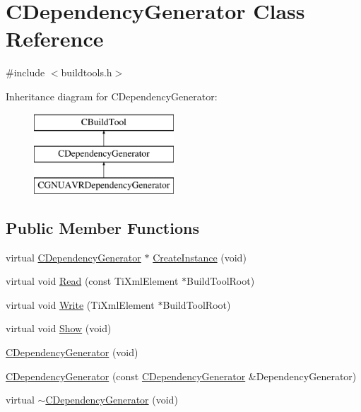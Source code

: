 \hypertarget{classCDependencyGenerator}{\section{C\-Dependency\-Generator Class Reference}
\label{classCDependencyGenerator}
}


{\ttfamily \#include $<$buildtools.\-h$>$}

Inheritance diagram for C\-Dependency\-Generator\-:\begin{figure}[H]
\begin{center}
\leavevmode
\includegraphics[height=3.000000cm]{dd/d5a/classCDependencyGenerator}
\end{center}
\end{figure}
\subsection*{Public Member Functions}
\begin{DoxyCompactItemize}
\item 
virtual \hyperlink{classCDependencyGenerator}{C\-Dependency\-Generator} $\ast$ \hyperlink{classCDependencyGenerator_af25a1710b95578b0e7ebcec02c4a7238}{Create\-Instance} (void)
\item 
virtual void \hyperlink{classCDependencyGenerator_aaaff3838bea1e65ba250b78f1746870c}{Read} (const Ti\-Xml\-Element $\ast$Build\-Tool\-Root)
\item 
virtual void \hyperlink{classCDependencyGenerator_a631a53bd18d1974f7375a665e17357a2}{Write} (Ti\-Xml\-Element $\ast$Build\-Tool\-Root)
\item 
virtual void \hyperlink{classCDependencyGenerator_a632c6eedf0b8d948748fb29f47545451}{Show} (void)
\item 
\hyperlink{classCDependencyGenerator_a286f57093ebd4b993c5a8e374abf74f9}{C\-Dependency\-Generator} (void)
\item 
\hyperlink{classCDependencyGenerator_aa79bde9f58c2051665f1c139e5661b94}{C\-Dependency\-Generator} (const \hyperlink{classCDependencyGenerator}{C\-Dependency\-Generator} \&Dependency\-Generator)
\item 
virtual \hyperlink{classCDependencyGenerator_a16c8c8474279be1dc68d76e0b5e34cb1}{$\sim$\-C\-Dependency\-Generator} (void)
\end{DoxyCompactItemize}
